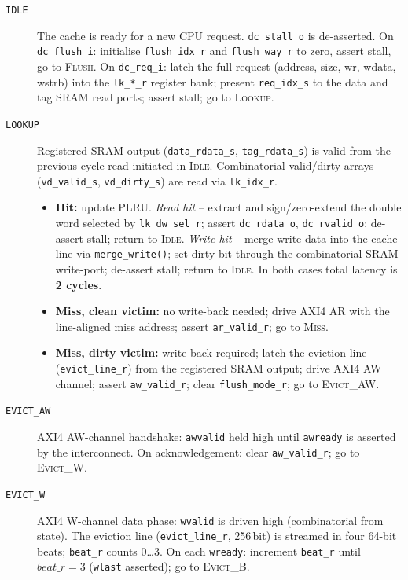 \begin{description}

  \item[\texttt{IDLE}]
    The cache is ready for a new CPU request.
    \texttt{dc\_stall\_o} is de-asserted.
    On \texttt{dc\_flush\_i}: initialise \texttt{flush\_idx\_r} and
    \texttt{flush\_way\_r} to zero, assert stall, go to \textsc{Flush}.
    On \texttt{dc\_req\_i}: latch the full request (address, size, wr,
    wdata, wstrb) into the \texttt{lk\_*\_r} register bank; present
    \texttt{req\_idx\_s} to the data and tag SRAM read ports; assert
    stall; go to \textsc{Lookup}.

  \item[\texttt{LOOKUP}]
    Registered SRAM output (\texttt{data\_rdata\_s}, \texttt{tag\_rdata\_s})
    is valid from the previous-cycle read initiated in \textsc{Idle}.
    Combinatorial valid/dirty arrays (\texttt{vd\_valid\_s},
    \texttt{vd\_dirty\_s}) are read via \texttt{lk\_idx\_r}.
    \begin{itemize}
      \item \textbf{Hit:}
        update PLRU.
        \emph{Read hit} -- extract and sign/zero-extend the double word
        selected by \texttt{lk\_dw\_sel\_r}; assert \texttt{dc\_rdata\_o},
        \texttt{dc\_rvalid\_o}; de-assert stall; return to \textsc{Idle}.
        \emph{Write hit} -- merge write data into the cache line via
        \texttt{merge\_write()}; set dirty bit through the combinatorial
        SRAM write-port; de-assert stall; return to \textsc{Idle}.
        In both cases total latency is \textbf{2 cycles}.
      \item \textbf{Miss, clean victim:}
        no write-back needed; drive AXI4 AR with the line-aligned miss
        address; assert \texttt{ar\_valid\_r}; go to \textsc{Miss}.
      \item \textbf{Miss, dirty victim:}
        write-back required; latch the eviction line
        (\texttt{evict\_line\_r}) from the registered SRAM output; drive
        AXI4 AW channel; assert \texttt{aw\_valid\_r};
        clear \texttt{flush\_mode\_r}; go to \textsc{Evict\_AW}.
    \end{itemize}

  \item[\texttt{EVICT\_AW}]
    AXI4 AW-channel handshake: \texttt{awvalid} held high until
    \texttt{awready} is asserted by the interconnect.
    On acknowledgement: clear \texttt{aw\_valid\_r}; go to
    \textsc{Evict\_W}.

  \item[\texttt{EVICT\_W}]
    AXI4 W-channel data phase: \texttt{wvalid} is driven high
    (combinatorial from state).
    The eviction line (\texttt{evict\_line\_r}, 256\,bit) is streamed in
    four 64-bit beats; \texttt{beat\_r} counts 0\ldots{}3.
    On each \texttt{wready}: increment \texttt{beat\_r} until
    $\mathit{beat\_r}{=}3$ (\texttt{wlast} asserted); go to
    \textsc{Evict\_B}.


\end{description}
